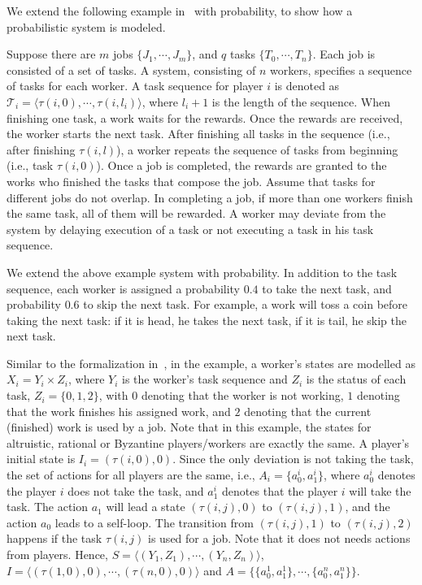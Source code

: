  We extend the following example in~\cite{MMS08} with probability, to show how a probabilistic system is modeled.
 \begin{example}\label{ssec:ex}
Suppose there are $m$ jobs $\{J_1, \cdots, J_m\}$, and $q$ tasks $\{T_0, \cdots, T_n\}$. Each job is consisted of a set of tasks.
A system, consisting of $n$ workers, specifies a sequence of tasks for each worker. A task sequence for player $i$ is denoted as $\mathcal{T}_i=\langle \tau(i,0), \cdots, \tau(i, l_i)\rangle$, where $l_{i}+1$ is the length of the sequence. When finishing one task, a work waits for the rewards. Once the rewards are received, the worker starts the next task. After finishing all tasks in the sequence (i.e., after finishing $\tau(i, l)$), a worker repeats the sequence of tasks from beginning (i.e., task $\tau(i,0)$). Once a job is completed, the rewards are granted to the works who finished the tasks that compose the job. Assume that tasks for different jobs do not overlap. In completing a job, if more than one workers finish the same task, all of them will be rewarded.
A worker may deviate from the system by delaying execution of a task or not executing a task in his task sequence.

We extend the above example system with probability. In addition to the task sequence, each worker is assigned a probability $0.4$ to take the next task, and probability $0.6$ to skip the next task. For example, a work will toss a coin before taking the next task: if it is head, he takes the next task, if it is tail, he skip the next task.
\end{example}

Similar to the formalization in~\cite{MMS08}, in the example, a worker's states are modelled as $X_i=Y_i\times Z_i$, where $Y_i$ is the worker's task sequence and $Z_i$ is the status of each task, $Z_i=\{0, 1, 2\}$, with $0$ denoting that the worker is not working, $1$ denoting that the work finishes his assigned work, and $2$ denoting that the current (finished) work is used by a job. Note that in this example, the states for altruistic, rational or Byzantine players/workers are exactly the same.
%
A player's initial state is $I_i=(\tau(i,0),0)$. Since the only deviation is not taking the task, the set of actions for all players are the same, i.e., $A_i=\{a^i_0, a^i_1\}$, where $a^i_0$
denotes the player $i$ does not take the task, and $a^i_1$ denotes that the player $i$ will take the task. The action $a_1$ will lead a state $(\tau(i, j), 0)$ to $(\tau(i, j), 1)$, and the action $a_0$ leads to a self-loop. The transition from $(\tau(i, j), 1)$ to $(\tau(i, j), 2)$ happens if the task $\tau(i, j)$ is used for a job. Note that it does not needs actions from players.
Hence, $S=\langle (Y_1, Z_1), \cdots, (Y_n, Z_n)\rangle$, $I=\langle(\tau(1,0), 0),\cdots,(\tau(n,0),0)\rangle$ and $A=\{\{a^1_0, a^1_1\}, \cdots, \{a^n_0, a^n_1\}\}$.

